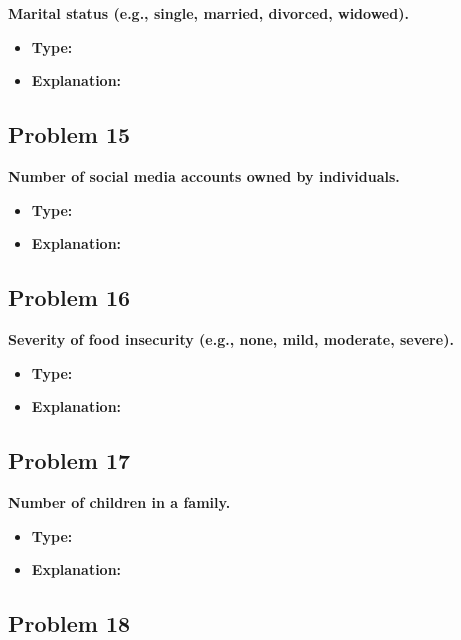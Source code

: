 \documentclass[
  letterpaper,
  DIV=11,
  numbers=noendperiod]{scrreprt}
\begin{document}
\textbf{Marital status (e.g., single, married, divorced, widowed).}

\begin{itemize}
\item
  \textbf{Type:}
\item
  \textbf{Explanation:}
\end{itemize}

\subsection*{Problem 15}\label{problem-15}

\textbf{Number of social media accounts owned by individuals.}

\begin{itemize}
\item
  \textbf{Type:}
\item
  \textbf{Explanation:}
\end{itemize}

\subsection*{Problem 16}\label{problem-16}

\textbf{Severity of food insecurity (e.g., none, mild, moderate,
severe).}

\begin{itemize}
\item
  \textbf{Type:}
\item
  \textbf{Explanation:}
\end{itemize}

\subsection*{Problem 17}\label{problem-17}

\textbf{Number of children in a family.}

\begin{itemize}
\item
  \textbf{Type:}
\item
  \textbf{Explanation:}
\end{itemize}

\subsection*{Problem 18}\label{problem-18}
\end{document}
